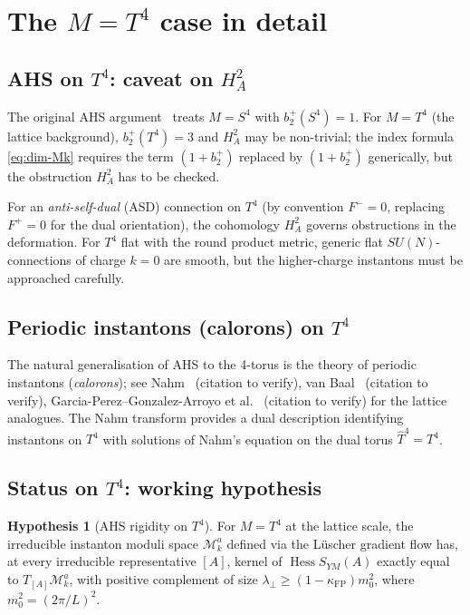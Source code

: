 \documentclass[11pt,a4paper]{amsart}
\theoremstyle{definition}
\newtheorem{hypothesis}[theorem]{Hypothesis}
\newcommand{\Mmod}{\mathcal{M}}
\DeclareMathOperator{\Hess}{Hess}
\newcommand{\kFP}{\kappa_{\mathrm{FP}}}
\begin{document}
\section{The $M=T^4$ case in detail}\label{sec:T4}

\subsection{AHS on $T^4$: caveat on $H^2_A$}
The original AHS argument~\cite{AtiyahHitchinSinger1978} treats
$M=S^4$ with $b^+_2(S^4) = 1$. For $M = T^4$ (the lattice background),
$b^+_2(T^4) = 3$ and $H^2_A$ may be non-trivial; the index formula
\eqref{eq:dim-Mk} requires the term $(1+b^+_2)$ replaced by
$(1+b^+_2)$ generically, but the obstruction $H^2_A$ has to be checked.

For an \emph{anti-self-dual} (ASD) connection on $T^4$
(by convention $F^- = 0$, replacing $F^+ = 0$ for the dual orientation),
the cohomology $H^2_A$ governs obstructions in the deformation.
For $T^4$ flat with the round product metric, generic flat
$SU(N)$-connections of charge $k=0$ are smooth, but the higher-charge
instantons must be approached carefully.

\subsection{Periodic instantons (calorons) on $T^4$}
The natural generalisation of AHS to the 4-torus is the theory of
periodic instantons (\emph{calorons}); see Nahm~\cite{Nahm1983}
(citation to verify), van Baal~\cite{vanBaal1996} (citation to verify),
Garcia-Perez--Gonzalez-Arroyo et al.~\cite{GarciaPerezGonzalezArroyo}
(citation to verify) for the lattice analogues. The Nahm transform
provides a dual description identifying instantons on $T^4$ with
solutions of Nahm's equation on the dual torus $\hat T^4 = T^4$.

\subsection{Status on $T^4$: working hypothesis}
\begin{hypothesis}[AHS rigidity on $T^4$]\label{hyp:AHS-T4}
For $M=T^4$ at the lattice scale, the irreducible instanton moduli
space $\Mmod_k^a$ defined via the L\"uscher gradient flow has, at every
irreducible representative $[A]$, kernel of $\Hess S_{YM}(A)$ exactly
equal to $T_{[A]}\Mmod_k^a$, with positive complement of size
$\lambda_\perp \geq (1-\kFP)m_0^2$, where $m_0^2 = (2\pi/L)^2$.
\end{hypothesis}
\end{document}
